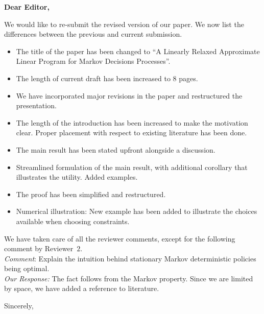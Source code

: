 \documentclass{letter}
\begin{document}

\begin{letter}{} %


\opening{\textbf{Dear Editor,}}
We would like to re-submit the revised version of our paper. We now list the differences between the previous and current submission.
\begin{itemize}
\item The title of the paper has been changed to ``A Linearly Relaxed Approximate Linear Program for Markov Decisions Processes''.
\item The length of current draft has been increased to 8 pages.
\item We have incorporated major revisions in the paper and restructured the presentation.
\item The length of the introduction has been increased to make the motivation clear. Proper placement with respect to existing literature has been done.
\item The main result has been stated upfront alongside a discussion.
\item Streamlined formulation of the main result, with additional corollary that illustrates the utility. Added examples.
\item The proof has been simplified and restructured.
\item Numerical illustration: New example has been added to illustrate the choices available when choosing constraints.
\end{itemize}
We have taken care of all the reviewer comments, except for the following comment by Reviewer~$2$.\\
\emph{Comment}: Explain the intuition behind stationary Markov deterministic policies being optimal.\\
\emph{Our Response:} The fact follows from the Markov property. Since we are limited by space, we have added a reference to literature.


\vspace{2\parskip} %
\closing{Sincerely,}
\vspace{2\parskip} %


\end{letter}
\end{document}
